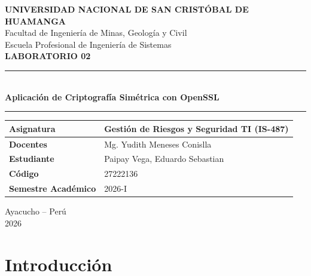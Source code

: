 \documentclass[11pt,a4paper]{article}
\begin{document}
\begin{titlepage}
\centering
\vspace*{1cm}
{\Large \textbf{UNIVERSIDAD NACIONAL DE SAN CRISTÓBAL DE HUAMANGA}}\\[0.4cm]
{\large Facultad de Ingeniería de Minas, Geología y Civil}\\[0.2cm]
{\large Escuela Profesional de Ingeniería de Sistemas}\\[1cm]
\vspace{1.3cm}
{\Huge \textbf{LABORATORIO 02}}\\[0.5cm]
\rule{15cm}{0.6pt}\\[0.4cm]
{\LARGE \textbf{Aplicación de Criptografía Simétrica con OpenSSL}}\\[0.4cm]
\rule{15cm}{0.6pt}
\vspace{1.5cm}
\begin{table}[H]
\centering
\renewcommand{\arraystretch}{1.5}
\begin{tabular}{|p{5cm}|p{7cm}|}
\hline
\textbf{Asignatura} & Gestión de Riesgos y Seguridad TI (IS-487) \\ \hline
\textbf{Docentes} & Mg. Yudith Meneses Conislla \\ \hline
\textbf{Estudiante} & Paipay Vega, Eduardo Sebastian \\ \hline
\textbf{Código} & 27222136 \\ \hline
\textbf{Semestre Académico} & 2026-I \\ \hline
\end{tabular}
\end{table}
\vfill
{\large Ayacucho -- Perú}\\[0.2cm]
{\large 2026}
\end{titlepage}

\newpage
\tableofcontents
\newpage

\section{Introducción}
\end{document}
